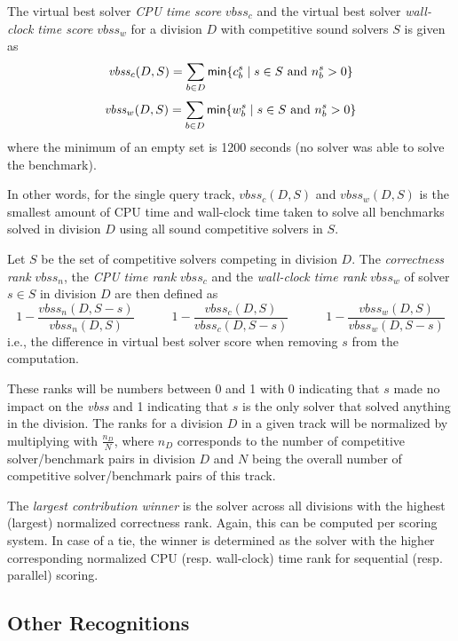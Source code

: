 \documentclass[12pt]{article}
\begin{document}
The virtual best solver \emph{CPU time score} $\mathit{vbss}_c$ and
the virtual best solver \emph{wall-clock time score} $\mathit{vbss}_w$ for a
division $D$ with competitive sound solvers $S$ is given as
\[
\mathit{vbss}_c(D,S) = \sum_{b \in D} {\sf min}\{ c_b^s \mid s \in S \text{ and } n_b^s > 0 \}
\]
\[
\mathit{vbss}_w(D,S) = \sum_{b \in D} {\sf min}\{ w_b^s \mid s \in S \text{ and } n_b^s > 0 \}
\]
where the minimum of an empty set is 1200 seconds
(no solver was able to solve the benchmark).

In other words, for the single query track,
$\mathit{vbss}_c(D,S)$  and $\mathit{vbss}_w(D,S)$ is the
smallest amount of CPU time and wall-clock time taken to solve all benchmarks
solved in division $D$ using all sound competitive solvers in $S$.

Let $S$ be the set of competitive solvers competing in division $D$.
The \emph{correctness rank} $\mathit{vbss}_n$, the \emph{CPU time rank}
$\mathit{vbss}_c$ and the \emph{wall-clock time rank} $\mathit{vbss}_w$
of solver $s \in S$ in division $D$ are then defined as
\[
1- \frac{\mathit{vbss}_n(D,S-s) }{ \mathit{vbss}_n (D,S)}
\hspace{3em}
1- \frac{\mathit{vbss}_c(D,S) }{ \mathit{vbss}_c(D,S-s)}
\hspace{3em}
1- \frac{\mathit{vbss}_w(D,S) }{ \mathit{vbss}_w(D,S-s)}
\]
i.e., the difference in virtual best solver score when removing $s$ from the
computation.

These ranks will be numbers between 0 and 1 with 0 indicating that $s$ made no
impact on the \emph{vbss} and 1 indicating that $s$ is the only solver that
solved anything in the division.
%
The ranks for a division $D$ in a given track will be normalized by multiplying
with $\frac{n_D}{N}$, where $n_D$ corresponds to the number of competitive
solver/benchmark pairs in division $D$ and $N$ being the overall number of
competitive solver/benchmark pairs of this track.

The \emph{largest contribution winner} is the solver across all divisions with
the highest (largest) normalized correctness rank. Again, this can be computed
per scoring system. In case of a tie, the winner is determined as the solver
with the higher corresponding normalized CPU (resp. wall-clock) time rank for
sequential (resp. parallel) scoring.

\subsection{Other Recognitions}
\end{document}
